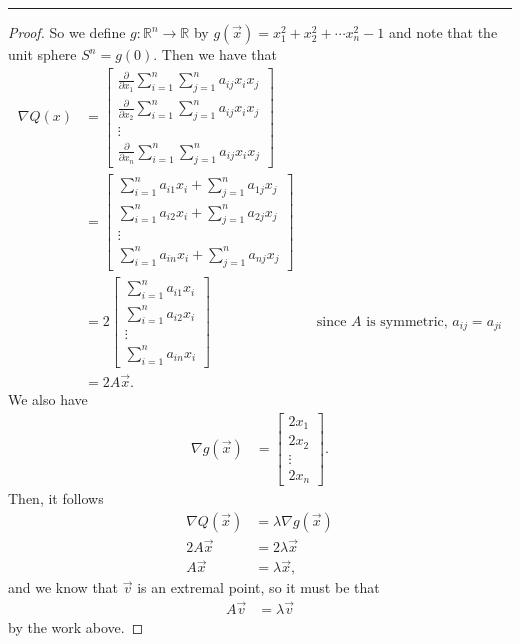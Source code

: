 \documentclass[leqno]{article}
\theoremstyle{nonumberplain}
\newtheorem{proof}{Proof}
\newcommand{\R}{\mathbb{R}}
\begin{document}
\noindent\rule[0.5ex]{\linewidth}{1pt}

\begin{proof}
So we define $g\colon \R^n \to \R$ by $g(\vec{x})=x_1^2+x_2^2+\cdots x_n^2 -1$ and note that the unit sphere $S^n = g(0)$. Then we have that 
\begin{align*}
\nabla Q(x)&=\begin{bmatrix}
\frac{\partial}{\partial x_1} \sum_{i=1}^n \sum_{j=1}^n a_{ij}x_i x_j\\
\frac{\partial}{\partial x_2} \sum_{i=1}^n \sum_{j=1}^n a_{ij}x_i x_j\\
\vdots\\
\frac{\partial}{\partial x_n} \sum_{i=1}^n \sum_{j=1}^n a_{ij}x_i x_j
\end{bmatrix}\\
&= \begin{bmatrix}
\sum_{i=1}^n a_{i1} x_i + \sum_{j=1}^n a_{1j} x_j\\
\sum_{i=1}^n a_{i2} x_i + \sum_{j=1}^n a_{2j} x_j\\
\vdots\\
\sum_{i=1}^n a_{in} x_i + \sum_{j=1}^n a_{nj} x_j
\end{bmatrix}\\
&=2 \begin{bmatrix}
\sum_{i=1}^n a_{i1} x_i\\
\sum_{i=1}^n a_{i2} x_i\\
\vdots \\
\sum_{i=1}^n a_{in} x_i
\end{bmatrix} && \textrm{since $A$ is symmetric, $a_{ij}=a_{ji}$}\\
&= 2 A\vec{x}.
\end{align*}
We also have
\begin{align*}
\nabla g(\vec{x})&=\begin{bmatrix}
2x_1\\
2x_2\\
\vdots\\
2x_n
\end{bmatrix}.
\end{align*}
Then, it follows 
\begin{align*}
\nabla Q(\vec{x}) &= \lambda \nabla g(\vec{x})\\
2A\vec{x}&= 2\lambda \vec{x}\\
A\vec{x}&=\lambda \vec{x},
\end{align*}
and we know that $\vec{v}$ is an extremal point, so it must be that 
\begin{align*}
A\vec{v}&=\lambda \vec{v}
\end{align*}
by the work above.


\end{proof}


\pagebreak
\end{document}
